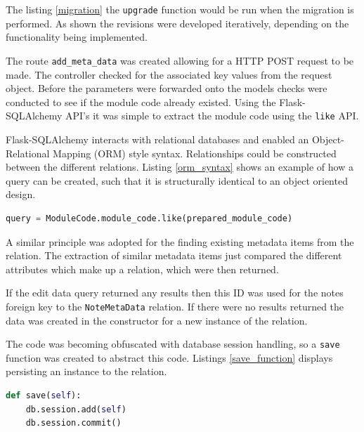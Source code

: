 {{{{{{{The listing \ref{migration} the \texttt{upgrade} function would be run when the migration is performed. As shown the revisions were developed iteratively, depending on the functionality being implemented.

The route \texttt{add\_meta\_data} was created allowing for a HTTP POST request to be made. The controller checked for the associated key values from the request object. Before the parameters were forwarded onto the models checks were conducted to see if the module code already existed. Using the Flask-SQLAlchemy \cite{citeulike:14025864} API's it was simple to extract the module code using the \texttt{like} API.



Flask-SQLAlchemy interacts with relational databases and enabled an Object-Relational Mapping (ORM) style syntax. Relationships could be constructed between the different relations. Listing \ref{orm_syntax} shows an example of how a query can be created, such that it is structurally identical to an object oriented design.

\begin{lstlisting}[language=python, caption={The module code class calls the module code attribute and compared its value against a prepared module code.}, label={orm_syntax}, breaklines, columns=fullflexible, keywordstyle=\color{blue}, basicstyle=\normalsize\ttfamily]
    query = ModuleCode.module_code.like(prepared_module_code)
\end{lstlisting}

A similar principle was adopted for the finding existing metadata items from the relation. The extraction of similar metadata items just compared the different attributes which make up a relation, which were then returned.

If the edit data query returned any results then this ID was used for the notes foreign key to the \texttt{NoteMetaData} relation. If there were no results returned the data was created in the constructor for a new instance of the relation.

The code was becoming obfuscated with database session handling, so a \texttt{save} function was created to abstract this code. Listings \ref{save_function} displays persisting an instance to the relation.
\begin{lstlisting}[language=python, caption={Save function that was abstracted to remove the db session handling from the controller}, label={save_function}, breaklines, columns=fullflexible, keywordstyle=\color{blue}, basicstyle=\normalsize\ttfamily]
  def save(self):
    db.session.add(self)
    db.session.commit()
\end{lstlisting}

}}}}}}}
